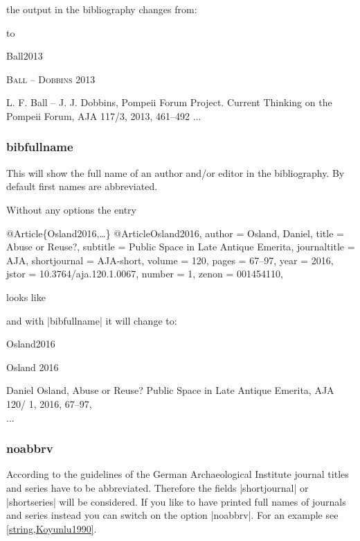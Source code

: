 \documentclass[a4paper,
10pt,
greek,
french,
spanish,
italian,
ngerman,
english
]{ltxdoc}
\begin{document}
the output in the bibliography changes from:


to 

\begin{bibbox}{Ball2013}\footnotesize
\parbox[t]{3cm}{{\scshape \color{red}Ball – Dobbins} 2013}\parbox[t]{8.5cm}{%
L. F. Ball – J. J. Dobbins, Pompeii Forum Project. Current Thinking on the Pompeii Forum, AJA 117/3, 2013, 461–492\newline
...}
\end{bibbox}

\subsubsection{bibfullname}\label{bibfullname}
This will show the full name of an author and/or editor in the bibliography. 
By default first names are abbreviated.

Without any options the entry

\begin{bibexample}[label=Osland2016]{{@}Article\{Osland2016,…\}}
@Article{Osland2016,
  author       = {Osland, Daniel},
  title        = {Abuse or Reuse?},
  subtitle     = {Public Space in Late Antique Emerita},
  journaltitle = AJA,
  shortjournal = AJA-short,
  volume       = {120},
  pages        = {67--97},
  year         = {2016},
  jstor        = {10.3764/aja.120.1.0067},
  number       = {1},
  zenon        = {001454110},
}
\end{bibexample}

looks like


and with |bibfullname| it will change to:

\begin{bibbox}{Osland2016}\footnotesize
\parbox[t]{2cm}{Osland 2016} \parbox[t]{9cm}{{\color{red}Daniel} Osland, Abuse or Reuse? Public Space in Late Antique Emerita, AJA 120/ 1, 2016, 67–97,\\
...}
\end{bibbox}

\subsubsection{noabbrv}\label{noabbrevs}
According to the guidelines of the German Archaeological Institute journal titles and series have to be abbreviated.
Therefore the fields |shortjournal| or |shortseries| will be considered. 
If you like to have printed full names of journals and series instead you can switch on the option |noabbrv|.
For an example see \cref{string,Koyunlu1990}.
\end{document}
